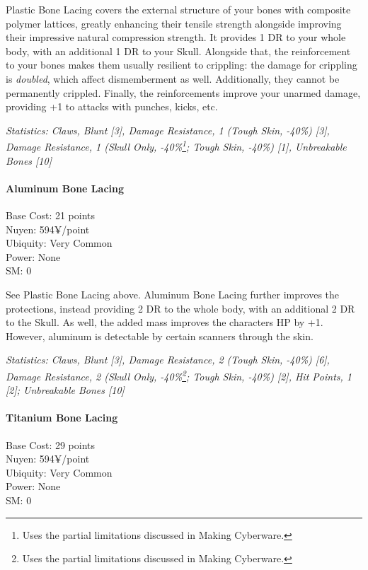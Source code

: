 \begin{multicols*}{3}
	Plastic Bone Lacing covers the external structure of your bones with composite polymer lattices, greatly enhancing their tensile strength alongside improving their impressive natural compression strength. It provides 1 DR to your whole body, with an additional 1 DR to your Skull. Alongside that, the reinforcement to your bones makes them usually resilient to crippling: the damage for crippling is \textit{doubled}, which affect dismemberment as well. Additionally, they cannot be permanently crippled. Finally, the reinforcements improve your unarmed damage, providing +1 to attacks with punches, kicks, etc.
	
	\textit{\textcolor{OliveGreen}{Statistics: Claws, Blunt [3], Damage Resistance, 1 (Tough Skin, -40\%) [3], Damage Resistance, 1 (Skull Only, -40\%\footnote {Uses the partial limitations discussed in Making Cyberware.}; Tough Skin, -40\%) [1], Unbreakable Bones [10]}}
	
	\paragraph{Aluminum Bone Lacing}
	\begin{flushright}
		Base Cost: 21 points\\
		Nuyen: 594¥/point\\
		Ubiquity: Very Common\\
		Power: None\\
		SM: 0
	\end{flushright}
	
	See Plastic Bone Lacing above. Aluminum Bone Lacing further improves the protections, instead providing 2 DR to the whole body, with an additional 2 DR to the Skull. As well, the added mass improves the characters HP by +1. However, aluminum is detectable by certain scanners through the skin.
	
	\textit{\textcolor{OliveGreen}{Statistics: Claws, Blunt [3], Damage Resistance, 2 (Tough Skin, -40\%) [6], Damage Resistance, 2 (Skull Only, -40\%\footnote {Uses the partial limitations discussed in Making Cyberware.}; Tough Skin, -40\%) [2], Hit Points, 1 [2]; Unbreakable Bones [10]}}
	
	\paragraph{Titanium Bone Lacing}
	\begin{flushright}
		Base Cost: 29 points\\
		Nuyen: 594¥/point\\
		Ubiquity: Very Common\\
		Power: None\\
		SM: 0
	\end{flushright}
	

\end{multicols*}

